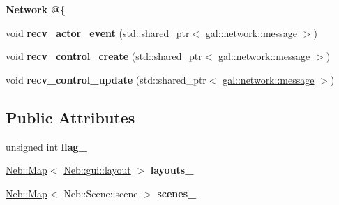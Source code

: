 \begin{Indent}{\bf \-Network @\{}
\begin{DoxyCompactItemize}
\item 
\hypertarget{classNeb_1_1app_ab7ca6fa6c02a538c380f1c1bf9c49fc8}{void {\bfseries recv\-\_\-actor\-\_\-event} (std\-::shared\-\_\-ptr$<$ \hyperlink{classgal_1_1network_1_1message}{gal\-::network\-::message} $>$)}\label{classNeb_1_1app_ab7ca6fa6c02a538c380f1c1bf9c49fc8}

\item 
\hypertarget{classNeb_1_1app_af9dfb6e16d0a0a2b1aea893c23110db1}{void {\bfseries recv\-\_\-control\-\_\-create} (std\-::shared\-\_\-ptr$<$ \hyperlink{classgal_1_1network_1_1message}{gal\-::network\-::message} $>$)}\label{classNeb_1_1app_af9dfb6e16d0a0a2b1aea893c23110db1}

\item 
\hypertarget{classNeb_1_1app_af78185f60b42955a1ac44e2dd3b16246}{void {\bfseries recv\-\_\-control\-\_\-update} (std\-::shared\-\_\-ptr$<$ \hyperlink{classgal_1_1network_1_1message}{gal\-::network\-::message} $>$)}\label{classNeb_1_1app_af78185f60b42955a1ac44e2dd3b16246}

\end{DoxyCompactItemize}
\end{Indent}
\subsection*{\-Public \-Attributes}
\begin{DoxyCompactItemize}
\item 
\hypertarget{classNeb_1_1app_aa783110fd25666e9f15e8c9acb76192e}{unsigned int {\bfseries flag\-\_\-}}\label{classNeb_1_1app_aa783110fd25666e9f15e8c9acb76192e}

\item 
\hypertarget{classNeb_1_1app_abfe758c67e44f77f245a72dd15904f62}{\hyperlink{classNeb_1_1Map}{\-Neb\-::\-Map}$<$ \hyperlink{classNeb_1_1gui_1_1layout}{\-Neb\-::gui\-::layout} $>$ {\bfseries layouts\-\_\-}}\label{classNeb_1_1app_abfe758c67e44f77f245a72dd15904f62}

\item 
\hypertarget{classNeb_1_1app_a7defdddd97e1452710df87885cd48976}{\hyperlink{classNeb_1_1Map}{\-Neb\-::\-Map}$<$ \-Neb\-::\-Scene\-::scene $>$ {\bfseries scenes\-\_\-}}\label{classNeb_1_1app_a7defdddd97e1452710df87885cd48976}

\end{DoxyCompactItemize}
